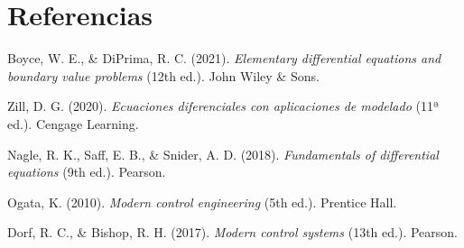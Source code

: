 \newpage
\section{Referencias}

\begin{thebibliography}{}

Boyce, W. E., \& DiPrima, R. C. (2021). \textit{Elementary differential equations and boundary value problems} (12th ed.). John Wiley \& Sons.

Zill, D. G. (2020). \textit{Ecuaciones diferenciales con aplicaciones de modelado} (11ª ed.). Cengage Learning.

Nagle, R. K., Saff, E. B., \& Snider, A. D. (2018). \textit{Fundamentals of differential equations} (9th ed.). Pearson.

Ogata, K. (2010). \textit{Modern control engineering} (5th ed.). Prentice Hall.

Dorf, R. C., \& Bishop, R. H. (2017). \textit{Modern control systems} (13th ed.). Pearson.

\end{thebibliography}
